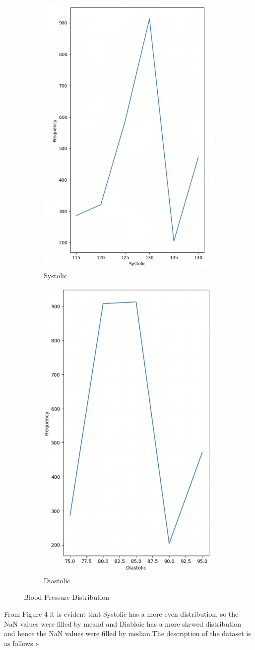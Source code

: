 \documentclass[10pt,twocolumn,letterpaper]{article}
\begin{document}
\begin{figure}[H]
   \centering
   \begin{subfigure}{.2\textwidth}
  
  \includegraphics[width=.4\linewidth]{systolic.png}
  \captionsetup{justification=raggedright, singlelinecheck=false}
  \caption{Systolic}
  \label{fig:sub1}
\end{subfigure}%
\begin{subfigure}{.2\textwidth}
  
  \includegraphics[width=0.4\linewidth]{Diastolic.png}
  \captionsetup{justification=raggedright, singlelinecheck=false}
  \caption{Diastolic}
  \label{fig:sub2}
\end{subfigure}
\caption{Blood Pressure Distribution}
\label{fig:test}
\end{figure}
From Figure 4 it is evident that Systolic has a more even distribution, so the NaN values were filled by meand and Diabloic has a more skewed distribution and hence the NaN values were filled by median.The description of the dataset is as follows :- 
\end{document}
